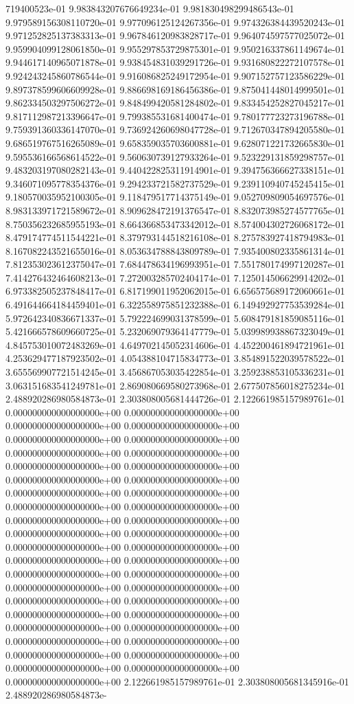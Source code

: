 719400523e-01	9.983843207676649234e-01	9.981830498299486543e-01	9.979589156308110720e-01	9.977096125124267356e-01	9.974326384439520243e-01	9.971252825137383313e-01	9.967846120983828717e-01	9.964074597577025072e-01	9.959904099128061850e-01	9.955297853729875301e-01	9.950216337861149674e-01	9.944617140965071878e-01	9.938454831039291726e-01	9.931680822272107578e-01	9.924243245860786544e-01	9.916086825249172954e-01	9.907152757123586229e-01	9.897378599606609928e-01	9.886698169186456386e-01	9.875041448014999501e-01	9.862334503297506272e-01	9.848499420581284802e-01	9.833454252827045217e-01	9.817112987213396647e-01	9.799385531681400474e-01	9.780177723273196788e-01	9.759391360336147070e-01	9.736924260698047728e-01	9.712670347894205580e-01	9.686519767516265089e-01	9.658359035703600881e-01	9.628071221732665830e-01	9.595536166568614522e-01	9.560630739127933264e-01	9.523229131859298757e-01	9.483203197080282143e-01	9.440422825311914901e-01	9.394756366627338151e-01	9.346071095778354376e-01	9.294233721582737529e-01	9.239110940745245415e-01	9.180570035952100305e-01	9.118479517714375149e-01	9.052709809054697576e-01	8.983133971721589672e-01	8.909628472191376547e-01	8.832073985274577765e-01	8.750356232685955193e-01	8.664366853473342012e-01	8.574004302726068172e-01	8.479174774511544221e-01	8.379793144518216108e-01	8.275783927418794983e-01	8.167082243521655016e-01	8.053634788843809789e-01	7.935400802335861314e-01	7.812353023612375047e-01	7.684478634196993951e-01	7.551780174997120287e-01	7.414276432464608213e-01	7.272003285702404174e-01	7.125014506629914202e-01	6.973382505237848417e-01	6.817199011952062015e-01	6.656575689172060661e-01	6.491644664184459401e-01	6.322558975851232388e-01	6.149492927753539284e-01	5.972642340836671337e-01	5.792224699031378599e-01	5.608479181859085116e-01	5.421666578609660725e-01	5.232069079364147779e-01	5.039989938867323049e-01	4.845753010072483269e-01	4.649702145052314606e-01	4.452200461894721961e-01	4.253629477187923502e-01	4.054388104715834773e-01	3.854891522039578522e-01	3.655569907721514245e-01	3.456867053035422854e-01	3.259238853105336231e-01	3.063151683541249781e-01	2.869080669580273968e-01	2.677507856018275234e-01	2.488920286980584873e-01	2.303808005681444726e-01	2.122661985157989761e-01	0.000000000000000000e+00	0.000000000000000000e+00	0.000000000000000000e+00	0.000000000000000000e+00	0.000000000000000000e+00	0.000000000000000000e+00	0.000000000000000000e+00	0.000000000000000000e+00	0.000000000000000000e+00	0.000000000000000000e+00	0.000000000000000000e+00	0.000000000000000000e+00	0.000000000000000000e+00	0.000000000000000000e+00	0.000000000000000000e+00	0.000000000000000000e+00	0.000000000000000000e+00	0.000000000000000000e+00	0.000000000000000000e+00	0.000000000000000000e+00	0.000000000000000000e+00	0.000000000000000000e+00	0.000000000000000000e+00	0.000000000000000000e+00	0.000000000000000000e+00	0.000000000000000000e+00	0.000000000000000000e+00	0.000000000000000000e+00	0.000000000000000000e+00	0.000000000000000000e+00	0.000000000000000000e+00	0.000000000000000000e+00	0.000000000000000000e+00	0.000000000000000000e+00	0.000000000000000000e+00	0.000000000000000000e+00	0.000000000000000000e+00	0.000000000000000000e+00	0.000000000000000000e+00	0.000000000000000000e+00	0.000000000000000000e+00	2.122661985157989761e-01	2.303808005681345916e-01	2.488920286980584873e-